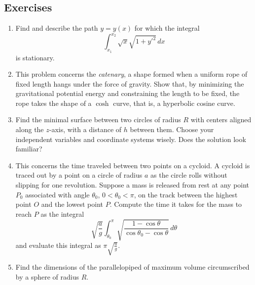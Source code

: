 \subsection{Exercises}
\begin{enumerate}
\item Find and describe the path $y = y(x)$ for which the integral 
\[
	\int_{x_1}^{x_2} \sqrt{x} \sqrt{1 + y'^2} \, dx 
\]
is stationary. 

\item This problem concerns the \textit{catenary}, a shape formed when a uniform rope of fixed length hangs under the force of gravity. Show that, by minimizing the gravitational potential energy and constraining the length to be fixed, the rope takes the shape of a $\cosh$ curve, that is, a hyperbolic cosine curve. 

\item Find the minimal surface between two circles of radius $R$ with centers aligned along the $z$-axis, with a distance of $h$ between them. Choose your independent variables and coordinate systems wisely. Does the solution look familiar? 

\item This concerns the time traveled between two points on a cycloid. A cycloid is traced out by a point on a circle of radius $a$ as the circle rolls without slipping for one revolution. Suppose a mass is released from rest at any point $P_0$ associated with angle $\theta_0$, $0 < \theta_0 < \pi$, on the track between the highest point $O$ and the lowest point $P$. Compute the time it takes for the mass to reach $P$ as the integral 
\[
	\sqrt{\frac{a}{g}} \int_{\theta_0}^\pi \sqrt{\frac{1-\cos\theta}{\cos\theta_0 - \cos \theta}} \, d\theta 
\]
and evaluate this integral as $\pi \sqrt{\frac{a}{g}}$.

\item Find the dimensions of the parallelopiped of maximum volume circumscribed by a sphere of radius $R$. 


\end{enumerate}